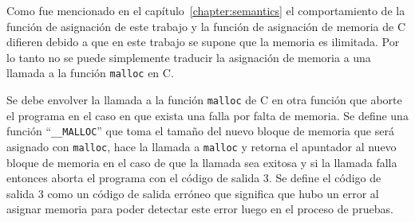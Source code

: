 Como fue mencionado en el capítulo~\ref{chapter:semantics} el comportamiento de la función de asignación de este trabajo y la función de asignación de memoria de C difieren debido a que en este trabajo se supone que la memoria es ilimitada.
Por lo tanto no se puede simplemente traducir la asignación de memoria a una llamada a la función \verb|malloc| en C.

Se debe envolver la llamada a la función \verb|malloc| de C en otra función que aborte el programa en el caso en que exista una falla por falta de memoria.
Se define una función ``\verb|__MALLOC|'' que toma el tamaño del nuevo bloque de memoria que será asignado con \verb|malloc|, hace la llamada a \verb|malloc| y retorna el apuntador al nuevo bloque de memoria en el caso de que la llamada sea exitosa y si la llamada falla entonces aborta el programa con el código de salida 3.
Se define el código de salida 3 como un código de salida erróneo que significa que hubo un error al asignar memoria para poder detectar este error luego en el proceso de pruebas.


